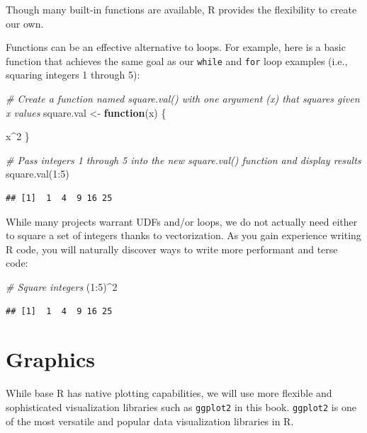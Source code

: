\documentclass[
]{book}
\newenvironment{Shaded}{\begin{snugshade}}{\end{snugshade}}
\newcommand{\CommentTok}[1]{\textcolor[rgb]{0.56,0.35,0.01}{\textit{#1}}}
\newcommand{\ControlFlowTok}[1]{\textcolor[rgb]{0.13,0.29,0.53}{\textbf{#1}}}
\newcommand{\DecValTok}[1]{\textcolor[rgb]{0.00,0.00,0.81}{#1}}
\newcommand{\FunctionTok}[1]{\textcolor[rgb]{0.00,0.00,0.00}{#1}}
\newcommand{\NormalTok}[1]{#1}
\newcommand{\OtherTok}[1]{\textcolor[rgb]{0.56,0.35,0.01}{#1}}
\newcommand{\SpecialCharTok}[1]{\textcolor[rgb]{0.00,0.00,0.00}{#1}}
\begin{document}
Though many built-in functions are available, R provides the flexibility to create our own.

Functions can be an effective alternative to loops. For example, here is a basic function that achieves the same goal as our \texttt{while} and \texttt{for} loop examples (i.e., squaring integers 1 through 5):

\begin{Shaded}
\begin{Highlighting}[]
\CommentTok{\# Create a function named square.val() with one argument (x) that squares given x values}
\NormalTok{square.val }\OtherTok{\textless{}{-}} \ControlFlowTok{function}\NormalTok{(x) \{}
  
\NormalTok{  x}\SpecialCharTok{\^{}}\DecValTok{2}
\NormalTok{\}}

\CommentTok{\# Pass integers 1 through 5 into the new square.val() function and display results}
\FunctionTok{square.val}\NormalTok{(}\DecValTok{1}\SpecialCharTok{:}\DecValTok{5}\NormalTok{)}
\end{Highlighting}
\end{Shaded}

\begin{verbatim}
## [1]  1  4  9 16 25
\end{verbatim}

While many projects warrant UDFs and/or loops, we do not actually need either to square a set of integers thanks to vectorization. As you gain experience writing R code, you will naturally discover ways to write more performant and terse code:

\begin{Shaded}
\begin{Highlighting}[]
\CommentTok{\# Square integers}
\NormalTok{(}\DecValTok{1}\SpecialCharTok{:}\DecValTok{5}\NormalTok{)}\SpecialCharTok{\^{}}\DecValTok{2}
\end{Highlighting}
\end{Shaded}

\begin{verbatim}
## [1]  1  4  9 16 25
\end{verbatim}

\hypertarget{graphics}{%
\section{Graphics}\label{graphics}}

While base R has native plotting capabilities, we will use more flexible and sophisticated visualization libraries such as \texttt{ggplot2} in this book. \texttt{ggplot2} is one of the most versatile and popular data visualization libraries in R.
\end{document}
